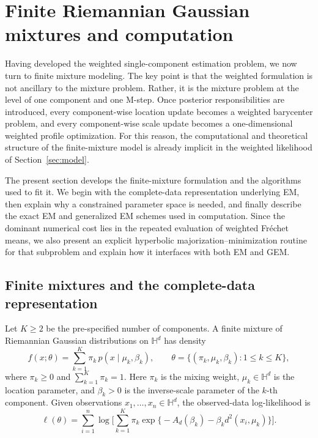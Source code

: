 \documentclass[11pt]{article}
\begin{document}
\section{Finite Riemannian Gaussian mixtures and computation}\label{sec:computation}

Having developed the weighted single-component estimation problem, we now turn to finite mixture modeling. The key point is that the weighted formulation is not ancillary to the mixture problem. Rather, it is the mixture problem at the level of one component and one M-step. Once posterior responsibilities are introduced, every component-wise location update becomes a weighted barycenter problem, and every component-wise scale update becomes a one-dimensional weighted profile optimization. For this reason, the computational and theoretical structure of the finite-mixture model is already implicit in the weighted likelihood of Section~\ref{sec:model}.

The present section develops the finite-mixture formulation and the algorithms used to fit it. We begin with the complete-data representation underlying EM, then explain why a constrained parameter space is needed, and finally describe the exact EM and generalized EM schemes used in computation. Since the dominant numerical cost lies in the repeated evaluation of weighted Fr\'echet means, we also present an explicit hyperbolic majorization--minimization routine for that subproblem and explain how it interfaces with both EM and GEM.

\subsection{Finite mixtures and the complete-data representation}\label{subsec:mixture-definition}

Let \(K\ge 2\) be the pre-specified number of components. A finite mixture of Riemannian Gaussian distributions on \(\mathbb{H}^d\) has density
\begin{equation}\label{eq:mixture-density}
f(x;\theta)
=
\sum_{k=1}^K \pi_k\, p(x\mid \mu_k,\beta_k),
\qquad
\theta=\{(\pi_k,\mu_k,\beta_k):1\le k\le K\},
\end{equation}
where \(\pi_k\ge 0\) and \(\sum_{k=1}^K \pi_k=1\). Here \(\pi_k\) is the mixing weight, \(\mu_k\in\mathbb{H}^d\) is the location parameter, and \(\beta_k>0\) is the inverse-scale parameter of the $k$-th component. Given observations \(x_1,\ldots,x_n\in\mathbb{H}^d\), the observed-data log-likelihood is
\begin{equation}\label{eq:observed-loglik}
\ell(\theta)
=
\sum_{i=1}^n
\log\Bigg[
\sum_{k=1}^K
\pi_k
\exp\!\Big\{
-A_d(\beta_k)-\beta_k d^2(x_i,\mu_k)
\Big\}
\Bigg].
\end{equation}
\end{document}
